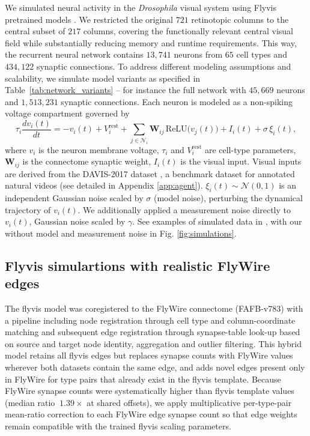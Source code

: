\documentclass{article}
\begin{document}
We simulated neural activity in the \emph{Drosophila} visual system using Flyvis pretrained models \citep{lappalainen_connectome-constrained_2024}. We restricted the original $721$
retinotopic columns to the central subset of $217$
columns, covering the functionally relevant central visual field while substantially reducing memory and runtime requirements. This way, the recurrent neural network contains $13{,}741$ neurons from $65$ cell types and $434{,}122$ synaptic connections. To address different modeling assumptions and scalability, we simulate model variants as specified in Table~\ref{tab:network_variants} -- for instance the full network with  $45{,}669$ neurons  and $1{,}513{,}231$ synaptic connections. 
Each neuron is modeled as a non-spiking voltage compartment governed by
\begin{equation}
\tau_i\frac{dv_i(t)}{dt} = -v_i(t) + V_i^{\text{rest}}
+ \sum_{j\in\mathcal{N}_i}\mathbf{W}_{ij}\,\text{ReLU}\!\big(v_j(t)\big)
+ I_i(t) + \sigma\,\xi_i(t),
\label{eq:simulated_update}
\end{equation}
where $v_i$ is the neuron membrane voltage, $\tau_i$ and $V_i^{\mathrm{rest}}$ are cell-type parameters, $\mathbf{W}_{ij}$ is the connectome synaptic weight, $I_i(t)$ is the visual input. 
Visual inputs are derived from the DAVIS-2017 dataset \citep{Pont-Tuset_arXiv_2017}, a benchmark dataset for annotated natural videos (see detailed in Appendix \ref{app:agent}). $\xi_i(t)\sim\mathcal{N}(0,1)$ is an independent Gaussian noise
scaled by $\sigma$ (model noise), perturbing the dynamical trajectory of $v_i(t)$. We additionally applied a measurement noise directly to $v_i(t)$, Gaussian noise scaled by $\gamma$. See examples of simulated data in \label{fig:stimulus_hexagons}, with our without model and measurement noise in Fig. \ref{fig:simulations}. 
         



\subsection*{Flyvis simulartions with realistic FlyWire edges}
The flyvis model was coregistered to the FlyWire connectome (FAFB-v783) with a pipeline including node registration through cell type and column-coordinate matching and subsequent edge registration through synapse-table look-up based on source and target node identity, aggregation and outlier filtering. This hybrid model retains all flyvis edges but replaces synapse counts with FlyWire values wherever both datasets contain the same edge, and adds novel edges present only in FlyWire for type pairs that already exist in the flyvis template. Because FlyWire synapse counts were systematically higher than flyvis template values (median ratio $~ 1.39\times$ at shared offsets), we apply multiplicative per-type-pair mean-ratio correction to each FlyWire edge synapse count so that edge weights remain compatible with the trained flyvis scaling parameters.
\end{document}
